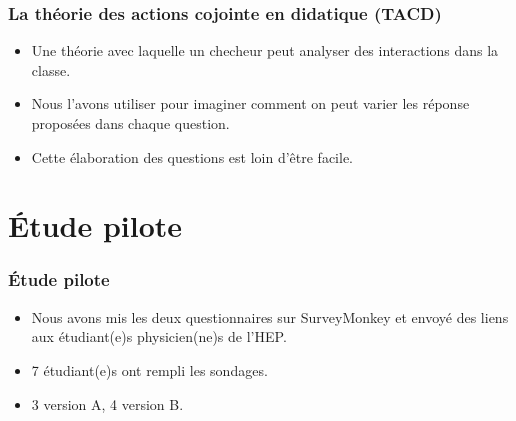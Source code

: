\documentclass{beamer}
\begin{document}
\begin{frame}
  \frametitle{La théorie des actions cojointe en didatique (TACD)}
  \begin{itemize}
    \item Une théorie avec laquelle un checheur peut analyser des interactions
      dans la classe.
    \item Nous l'avons utiliser pour imaginer comment on peut varier
      les réponse proposées dans chaque question.
      \item Cette élaboration des questions est loin d'être facile.
    \end{itemize}
\end{frame}

\section{Étude pilote}
\begin{frame}
\frametitle{Étude pilote}
  \begin{itemize}
  \item Nous avons mis les deux questionnaires sur SurveyMonkey et envoyé des liens aux étudiant(e)s
  physicien(ne)s de l'HEP.
  \item 7 étudiant(e)s ont rempli les sondages.
    \item 3 version A, 4 version B.
    \end{itemize}

\end{frame}
\end{document}
